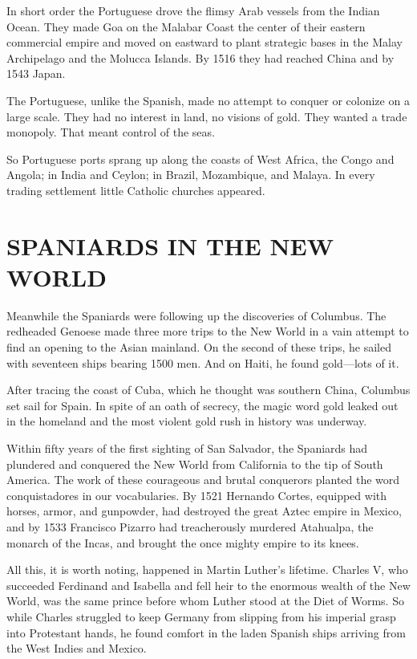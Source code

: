 In short order the Portuguese drove the flimsy Arab vessels from the Indian Ocean. They made Goa on
the Malabar Coast the center of their eastern commercial empire and moved on eastward to plant
strategic bases in the Malay Archipelago and the Molucca Islands. By 1516 they had reached China and
by 1543 Japan.

The Portuguese, unlike the Spanish, made no attempt to conquer or colonize on a large scale. They
had no interest in land, no visions of gold. They wanted a trade monopoly. That meant control of the
seas.

So Portuguese ports sprang up along the coasts of West Africa, the Congo and Angola; in India and
Ceylon; in Brazil, Mozambique, and Malaya. In every trading settlement little Catholic churches
appeared.

\section{SPANIARDS IN THE NEW WORLD}

Meanwhile the Spaniards were following up the discoveries of Columbus. The redheaded Genoese made
three more trips to the New World in a vain attempt to find an opening to the Asian mainland. On the
second of these trips, he sailed with seventeen ships bearing 1500 men. And on Haiti, he found
gold—lots of it.

After tracing the coast of Cuba, which he thought was southern China, Columbus set sail for Spain.
In spite of an oath of secrecy, the magic word gold leaked out in the homeland and the most violent
gold rush in history was underway.

Within fifty years of the first sighting of San Salvador, the Spaniards had plundered and conquered
the New World from California to the tip of South America. The work of these courageous and brutal
conquerors planted the word conquistadores in our vocabularies. By 1521 Hernando Cortes, equipped
with horses, armor, and gunpowder, had destroyed the great Aztec empire in Mexico, and by 1533
Francisco Pizarro had treacherously murdered Atahualpa, the monarch of the Incas, and brought the
once mighty empire to its knees.

All this, it is worth noting, happened in Martin Luther’s lifetime. Charles V, who succeeded
Ferdinand and Isabella and fell heir to the enormous wealth of the New World, was the same prince
before whom Luther stood at the Diet of Worms. So while Charles struggled to keep Germany from
slipping from his imperial grasp into Protestant hands, he found comfort in the laden Spanish ships
arriving from the West Indies and Mexico.


